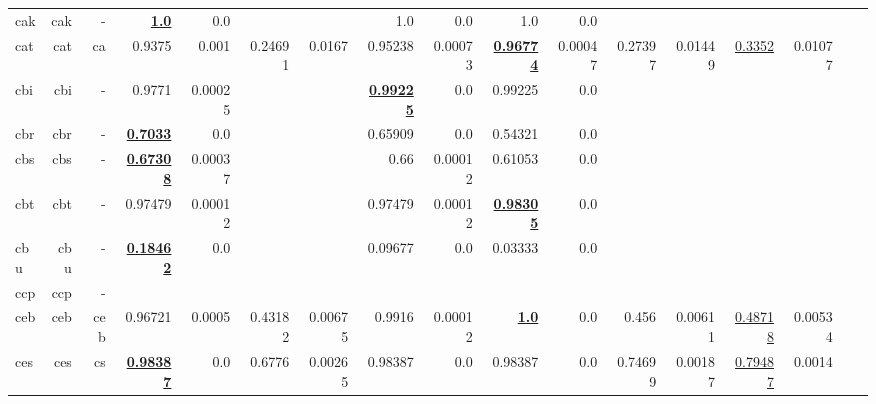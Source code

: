 \documentclass[11pt]{article}
\begin{document}
\begin{table*}[h]
{\begin{tabular}{lrrrrrrrrrrrrrrrr}
cak         & cak         & -         & \textbf{\underline{1.0}}         & 0.0         &          &          & 1.0         & 0.0         & 1.0         & 0.0         &          &          &          &          \\
cat         & cat         & ca         & 0.9375         & 0.001         & 0.24691         & 0.0167         & 0.95238         & 0.00073         & \textbf{\underline{0.96774}}         & 0.00047         & 0.27397         & 0.01449         & \underline{0.3352}         & 0.01077         \\
cbi         & cbi         & -         & 0.9771         & 0.00025         &          &          & \textbf{\underline{0.99225}}         & 0.0         & 0.99225         & 0.0         &          &          &          &          \\
cbr         & cbr         & -         & \textbf{\underline{0.7033}}         & 0.0         &          &          & 0.65909         & 0.0         & 0.54321         & 0.0         &          &          &          &          \\
cbs         & cbs         & -         & \textbf{\underline{0.67308}}         & 0.00037         &          &          & 0.66         & 0.00012         & 0.61053         & 0.0         &          &          &          &          \\
cbt         & cbt         & -         & 0.97479         & 0.00012         &          &          & 0.97479         & 0.00012         & \textbf{\underline{0.98305}}         & 0.0         &          &          &          &          \\
cbu         & cbu         & -         & \textbf{\underline{0.18462}}         & 0.0         &          &          & 0.09677         & 0.0         & 0.03333         & 0.0         &          &          &          &          \\
ccp         & ccp         & -         &          &          &          &          &          &          &          &          &          &          &          &          \\
ceb         & ceb         & ceb         & 0.96721         & 0.0005         & 0.43182         & 0.00675         & 0.9916         & 0.00012         & \textbf{\underline{1.0}}         & 0.0         & 0.456         & 0.00611         & \underline{0.48718}         & 0.00534         \\
ces         & ces         & cs         & \textbf{\underline{0.98387}}         & 0.0         & 0.6776         & 0.00265         & 0.98387         & 0.0         & 0.98387         & 0.0         & 0.74699         & 0.00187         & \underline{0.79487}         & 0.0014         \\

\end{tabular}}
\end{table*}
\end{document}
